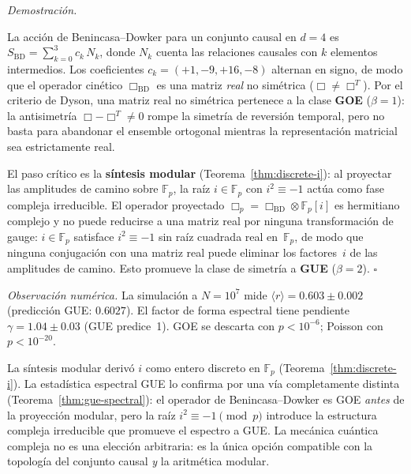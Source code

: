 \documentclass[11pt, a4paper, openany]{book}
\renewenvironment{proof}[1][Demostraci\'on]{%
  \par\noindent\textit{#1.}\quad
}{\hfill$\square$\par\medskip}
\begin{document}
\begin{proof}
La acci\'on de Benincasa--Dowker para un conjunto causal en $d = 4$ es
$S_{\mathrm{BD}} = \sum_{k=0}^{3} c_k\,N_k$, donde $N_k$ cuenta las
relaciones causales con $k$ elementos intermedios. Los coeficientes
$c_k = (+1, -9, +16, -8)$ alternan en signo, de modo que el operador
cin\'etico $\Box_{\mathrm{BD}}$ es una matriz \emph{real} no
sim\'etrica ($\Box \neq \Box^T$). Por el criterio de Dyson, una
matriz real no sim\'etrica pertenece a la clase \textbf{GOE}
($\beta = 1$): la antisimetr\'ia $\Box - \Box^T \neq 0$ rompe la
simetr\'ia de reversi\'on temporal, pero no basta para abandonar el
ensemble ortogonal mientras la representaci\'on matricial sea
estrictamente real.

El paso cr\'itico es la \textbf{s\'intesis modular}
(Teorema~\ref{thm:discrete-i}): al proyectar las amplitudes de
camino sobre $\mathbb{F}_p$, la ra\'iz $i \in \mathbb{F}_p$ con
$i^2 \equiv -1$ act\'ua como fase compleja irreducible. El operador
proyectado $\Box_p = \Box_{\mathrm{BD}} \otimes \mathbb{F}_p[i]$ es
hermitiano complejo y no puede reducirse a una matriz real por ninguna
transformaci\'on de gauge: $i \in \mathbb{F}_p$ satisface
$i^2 \equiv -1$ sin ra\'iz cuadrada real en~$\mathbb{F}_p$, de modo
que ninguna conjugaci\'on con una matriz real puede eliminar los
factores~$i$ de las amplitudes de camino. Esto promueve la clase de
simetr\'ia a \textbf{GUE} ($\beta = 2$).
\end{proof}

\noindent\textit{Observaci\'on num\'erica.}\enspace
La simulaci\'on a $N = 10^7$ mide
$\langle r \rangle = 0{.}603 \pm 0{.}002$
(predicci\'on GUE: $0{.}6027$).
El factor de forma espectral tiene pendiente
$\gamma = 1{.}04 \pm 0{.}03$ (GUE predice~1). GOE se descarta con
$p < 10^{-6}$; Poisson con $p < 10^{-20}$.

\begin{result}[title={El espectro diagnostica la unidad imaginaria}]
\label{res:gue-i-confirmation}
La s\'intesis modular deriv\'o $i$ como entero discreto en
$\mathbb{F}_p$ (Teorema~\ref{thm:discrete-i}). La estad\'istica
espectral GUE lo confirma por una v\'ia completamente distinta
(Teorema~\ref{thm:gue-spectral}): el operador de
Benincasa--Dowker es GOE \emph{antes} de la proyecci\'on modular,
pero la ra\'iz $i^2 \equiv -1 \pmod{p}$ introduce la estructura
compleja irreducible que promueve el espectro a GUE.
La mec\'anica cu\'antica compleja no es una elecci\'on
arbitraria: es la \'unica opci\'on compatible con la topolog\'ia del
conjunto causal \emph{y} la aritm\'etica modular.
\end{result}
\end{document}
